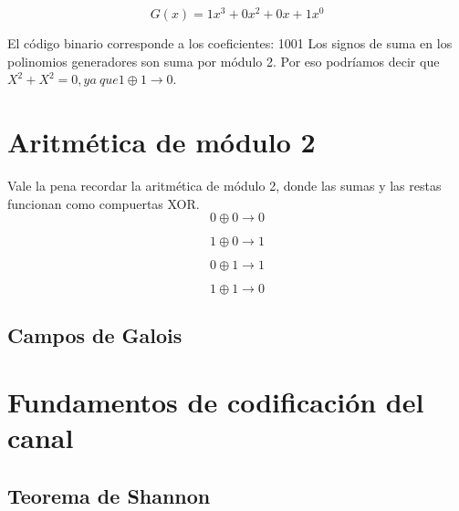 \begin{equation} \label{capsiete_dos}
G(x)= 1x^{3}+0 x^{2}+0 x +1x^{0}
\end{equation}

El código binario corresponde a los coeficientes: 1001 
Los signos de suma en los polinomios generadores son suma por módulo 2. Por eso podríamos decir que $X^{2}+X^{2}=0, ya \ que 1 \oplus 1 \rightarrow 0.$


\section{Aritmética de módulo 2}

Vale la pena recordar la aritmética de módulo 2, donde las sumas y las restas funcionan como compuertas XOR.\\


\begin{equation} \label{capsiete_tres}
0 \oplus 0 \rightarrow 0
\end{equation}

\begin{equation} \label{capsiete_cuatro}
1 \oplus 0 \rightarrow 1
\end{equation}

\begin{equation} \label{capsiete_cinco}
0 \oplus 1 \rightarrow 1
\end{equation}

\begin{equation} \label{capsiete_seis}
1 \oplus 1 \rightarrow 0
\end{equation}

\subsection{Campos de Galois}

\section{Fundamentos de codificación del canal}

\subsection{Teorema de Shannon}

